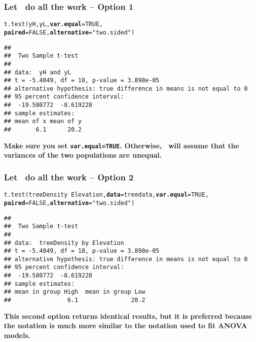 \documentclass[color=usenames,dvipsnames]{beamer}\usepackage[]{graphicx}\usepackage[]{color}
\makeatletter
\newcommand{\hlnum}[1]{\textcolor[rgb]{0.69,0.494,0}{#1}}%
\newcommand{\hlstr}[1]{\textcolor[rgb]{0.749,0.012,0.012}{#1}}%
\newcommand{\hlopt}[1]{\textcolor[rgb]{0,0,0}{#1}}%
\newcommand{\hlstd}[1]{\textcolor[rgb]{0,0,0}{#1}}%
\newcommand{\hlkwc}[1]{\textcolor[rgb]{0,0,0}{\textbf{#1}}}%
\newcommand{\hlkwd}[1]{\textcolor[rgb]{0.004,0.004,0.506}{#1}}%
\newenvironment{kframe}{%
 \def\at@end@of@kframe{}%
 \ifinner\ifhmode%
  \def\at@end@of@kframe{\end{minipage}}%
  \begin{minipage}{\columnwidth}%
 \fi\fi%
 \def\FrameCommand##1{\hskip\@totalleftmargin \hskip-\fboxsep
 \colorbox{shadecolor}{##1}\hskip-\fboxsep
     \hskip-\linewidth \hskip-\@totalleftmargin \hskip\columnwidth}%
 \MakeFramed {\advance\hsize-\width
   \@totalleftmargin\z@ \linewidth\hsize
   \@setminipage}}%
 {\par\unskip\endMakeFramed%
 \at@end@of@kframe}
\newenvironment{knitrout}{}{} %
\makeatother
\begin{document}
\begin{frame}[fragile]
  \frametitle{Let \R~do all the work -- Option 1}
  \footnotesize
\begin{knitrout}
\color{fgcolor}\begin{kframe}
\begin{alltt}
\hlkwd{t.test}\hlstd{(yH, yL,} \hlkwc{var.equal}\hlstd{=}\hlnum{TRUE}\hlstd{,}
       \hlkwc{paired}\hlstd{=}\hlnum{FALSE}\hlstd{,} \hlkwc{alternative}\hlstd{=}\hlstr{"two.sided"}\hlstd{)}
\end{alltt}
\begin{verbatim}
## 
## 	Two Sample t-test
## 
## data:  yH and yL
## t = -5.4049, df = 18, p-value = 3.898e-05
## alternative hypothesis: true difference in means is not equal to 0
## 95 percent confidence interval:
##  -19.580772  -8.619228
## sample estimates:
## mean of x mean of y 
##       6.1      20.2
\end{verbatim}
\end{kframe}
\end{knitrout}
\vfill
{\centering \bf
  Make sure you set {\tt var.equal=TRUE}. Otherwise, \R~will assume
  that the variances of the two populations are unequal. \\
}
\end{frame}



\begin{frame}[fragile]
  \frametitle{Let \R~do all the work -- Option 2}
  \footnotesize
\begin{knitrout}
\color{fgcolor}\begin{kframe}
\begin{alltt}
\hlkwd{t.test}\hlstd{(treeDensity} \hlopt{~} \hlstd{Elevation,} \hlkwc{data}\hlstd{=treedata,} \hlkwc{var.equal}\hlstd{=}\hlnum{TRUE}\hlstd{,}
       \hlkwc{paired}\hlstd{=}\hlnum{FALSE}\hlstd{,} \hlkwc{alternative}\hlstd{=}\hlstr{"two.sided"}\hlstd{)}
\end{alltt}
\begin{verbatim}
## 
## 	Two Sample t-test
## 
## data:  treeDensity by Elevation
## t = -5.4049, df = 18, p-value = 3.898e-05
## alternative hypothesis: true difference in means is not equal to 0
## 95 percent confidence interval:
##  -19.580772  -8.619228
## sample estimates:
## mean in group High  mean in group Low 
##                6.1               20.2
\end{verbatim}
\end{kframe}
\end{knitrout}
\vfill
{\centering \bf
  This second option returns identical results, but it is preferred
  because the notation is much more similar to the notation used to
  fit ANOVA models. \\
}
\end{frame}
\end{document}
